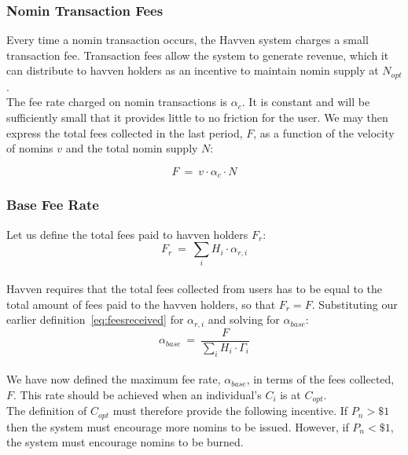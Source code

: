 \newpage

\subsubsection{Nomin Transaction Fees}
Every time a nomin transaction occurs, the Havven system charges a small
transaction fee. Transaction fees allow the system to generate revenue, which
it can distribute to havven holders as an incentive to maintain nomin supply
at \(N_{opt}\). \\

\noindent The fee rate charged on nomin transactions is \(\alpha_c\). It is
constant and will be sufficiently small that it provides little to no
friction for the user. We may then express the total fees collected in the
last period, \(F\), as a function of the velocity of nomins \(v\) and the total
nomin supply \(N\):

\begin{equation}
    F \ = \ v \cdot \alpha_c \cdot N
\end{equation}

\subsubsection{Base Fee Rate}

Let us define the total fees paid to havven holders \(F_{r}\): \\

\begin{equation}
F_{r} \ = \ \sum_{i} H_{i} \cdot \alpha_{r,i} \label{eq:totalfeesreceived}
\end{equation} \\

\noindent Havven requires that the total fees collected from users has to be
equal to the total amount of fees paid to the havven holders, so that \(F_{r}
= F\). Substituting our earlier definition~\eqref{eq:feesreceived} for
\(\alpha_{r,i}\) and solving for \(\alpha_{base} \): \\

\begin{equation}
\alpha_{base} \ = \ \frac{F}{\sum_{i} H_{i} \cdot \mathit{\Gamma}_{i}} \label{eq:10}
\end{equation} \\

\noindent We have now defined the maximum fee rate, \(\alpha_{base}\), in terms
of the fees collected, \(F\). This rate should be achieved when an individual's
\(C_i\) is at \(C_{opt}\). \\

\noindent The definition of \(C_{opt}\) must therefore provide the following
incentive. If \(P_n > \$1\) then the system must encourage more nomins to be
issued. However, if \(P_n < \$1\), the system must encourage nomins to be
burned.
